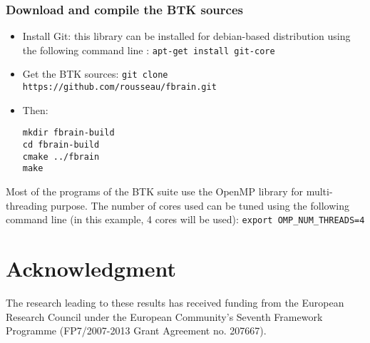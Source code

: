 \documentclass[a4paper,10pt]{article}
\begin{document}
\subsubsection{Download and compile the BTK sources}
\begin{itemize}
 \item Install Git: this library can be installed for debian-based distribution using the following command line : \texttt{apt-get install git-core}
 \item Get the BTK sources: \texttt{git clone https://github.com/rousseau/fbrain.git }
 \item Then:
\begin{verbatim}
mkdir fbrain-build
cd fbrain-build
cmake ../fbrain
make
\end{verbatim}
\end{itemize}

Most of the programs of the BTK suite use the OpenMP library for multi-threading
purpose. The number of cores used can be tuned using the following command line
(in this example, 4 cores will be used): \texttt{export OMP\_NUM\_THREADS=4}




\section*{Acknowledgment}
\small{The research leading to these results has received funding from the
European Research Council under the European Community’s Seventh Framework
Programme (FP7/2007-2013 Grant Agreement no. 207667).}



\end{document}
